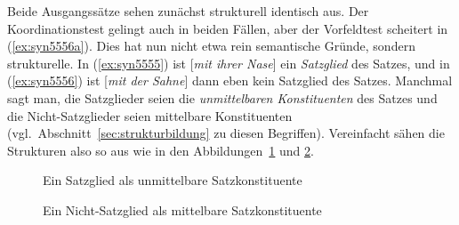 \begin{sloppypar}
\begin{exe}
  \ex\label{ex:syn5555}
  \begin{xlist}
  \end{xlist}
  \ex\label{ex:syn5556}
  \begin{xlist}
  \end{xlist}
\end{exe}
\end{sloppypar}

Beide Ausgangssätze sehen zunächst strukturell identisch aus.
Der Koordinationstest gelingt auch in beiden Fällen, aber der Vorfeldtest scheitert in (\ref{ex:syn5556a}).
Dies hat nun nicht etwa rein semantische Gründe, sondern strukturelle.
In (\ref{ex:syn5555}) ist [\textit{mit ihrer Nase}] ein \textit{Satzglied} des Satzes, und in (\ref{ex:syn5556}) ist [\textit{mit der Sahne}] dann eben kein Satzglied des Satzes.
Manchmal sagt man, die Satzglieder seien die \textit{unmittelbaren Konstituenten} des Satzes und die Nicht-Satzglieder seien mittelbare Konstituenten (vgl.\ Abschnitt~\ref{sec:strukturbildung} zu diesen Begriffen).
Vereinfacht sähen die Strukturen also so aus wie in den Abbildungen~\ref{fig:unmittelbarekonstituente} und \ref{fig:mittelbarekonstituente}.

\begin{figure}[!htbp]
  \centering
  \caption{Ein Satzglied als unmittelbare Satzkonstituente}
  \label{fig:unmittelbarekonstituente}
\end{figure}

\begin{figure}[!htbp]
  \centering
  \caption{Ein Nicht-Satzglied als mittelbare Satzkonstituente}
  \label{fig:mittelbarekonstituente}
\end{figure}

